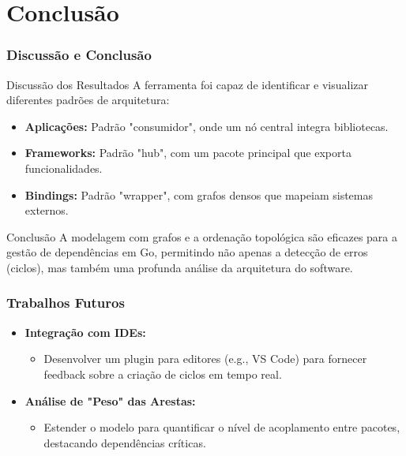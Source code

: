 \documentclass{beamer}
\begin{document}
\section{Conclusão}
\begin{frame}
  \frametitle{Discussão e Conclusão}
  
  \begin{block}{Discussão dos Resultados}
    A ferramenta foi capaz de identificar e visualizar diferentes padrões de arquitetura:
    \begin{itemize}
        \item \textbf{Aplicações:} Padrão "consumidor", onde um nó central integra bibliotecas.
        \item \textbf{Frameworks:} Padrão "hub", com um pacote principal que exporta funcionalidades.
        \item \textbf{Bindings:} Padrão "wrapper", com grafos densos que mapeiam sistemas externos.
    \end{itemize}
  \end{block}
  
  \begin{block}{Conclusão}
      A modelagem com grafos e a ordenação topológica são eficazes para a gestão de dependências em Go, permitindo não apenas a detecção de erros (ciclos), mas também uma profunda análise da arquitetura do software.
  \end{block}
\end{frame}

\begin{frame}
  \frametitle{Trabalhos Futuros}
  
    \begin{itemize}
        \item \textbf{Integração com IDEs:}
        \begin{itemize}
            \item Desenvolver um plugin para editores (e.g., VS Code) para fornecer feedback sobre a criação de ciclos em tempo real.
        \end{itemize}
        \bigskip
        \item \textbf{Análise de "Peso" das Arestas:}
        \begin{itemize}
            \item Estender o modelo para quantificar o nível de acoplamento entre pacotes, destacando dependências críticas.
        \end{itemize}
    \end{itemize}
\end{frame}
\end{document}
